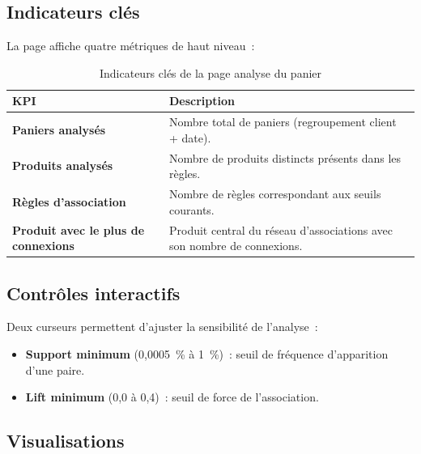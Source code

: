 \documentclass[12pt,a4paper,twoside]{report}
\begin{document}
\subsection{Indicateurs clés}

La page affiche quatre métriques de haut niveau~:

\begin{table}[H]
\centering
{}
\begin{tabularx}{\textwidth}{>{\bfseries}p{4cm}X}
\toprule
\rowcolor{TableHeader}
\color{white}KPI & \color{white}Description \\
\midrule
Paniers analysés & Nombre total de paniers (regroupement client + date). \\
Produits analysés & Nombre de produits distincts présents dans les règles. \\
Règles d'association & Nombre de règles correspondant aux seuils courants. \\
Produit avec le plus de connexions & Produit central du réseau d'associations avec son nombre de connexions. \\
\bottomrule
\end{tabularx}
\caption{Indicateurs clés de la page analyse du panier}
\end{table}

\subsection{Contrôles interactifs}

Deux curseurs permettent d'ajuster la sensibilité de l'analyse~:

\begin{itemize}
  \item \textbf{Support minimum} (0,0005~\% à 1~\%)~: seuil de fréquence d'apparition d'une paire.
  \item \textbf{Lift minimum} (0,0 à 0,4)~: seuil de force de l'association.
\end{itemize}

\subsection{Visualisations}
\end{document}
